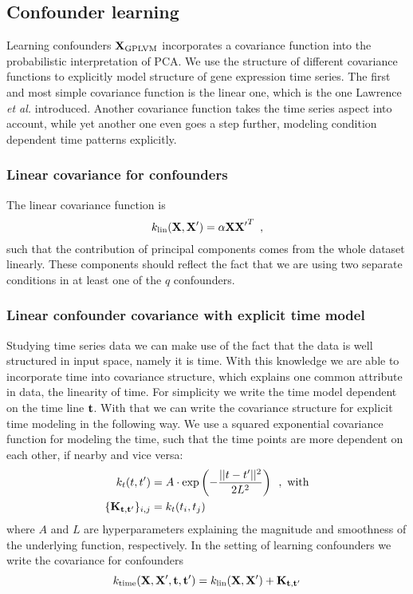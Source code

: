 \documentclass[11pt,a4paper,titlepage,twoside,tablecaptionabove]{article}
\begin{document}
\subsection{Confounder learning}
\label{sec:confounder-learning}

Learning confounders ${\bf X}_\text{GPLVM}$ incorporates a covariance
function into the probabilistic interpretation of PCA. We use
the structure of different covariance functions to explicitly model
structure of gene expression time series. The first and most simple
covariance function is the linear one, which is the one Lawrence {\it
  et al.} \cite{lawrence2004gaussian} introduced. Another covariance
function takes the time series aspect into account, while yet
another one even goes a step further, modeling condition dependent
time patterns explicitly.

\subsubsection{Linear covariance for confounders}
\label{sec:line-covar-conf}

The linear covariance function is
\begin{equation}
  \label{eq:5}
  k_\text{lin}({\bf X},{\bf X'}) = \alpha {\bf X}{\bf X'}^T\enspace,
\end{equation}
such that the contribution of principal components comes from the
whole dataset linearly. These components should reflect the fact that
we are using two separate conditions in at least one of the $q$
confounders. 

\subsubsection{Linear confounder covariance with explicit time model}
\label{sec:line-conf-covar}

Studying time series data we can make use of the fact that the data is
well structured in input space, namely it is time. With this knowledge
we are able to incorporate time into covariance structure, which
explains one common attribute in data, the linearity of time. For
simplicity we write the time model dependent on the time line $\bf
t$. With that we can write the covariance structure for explicit time
modeling in the following way. We use a squared exponential covariance
function for modeling the time, such that the time points are more dependent
on each other, if nearby and vice versa:
\begin{align}
  \label{eq:6}
  k_t(t,t') & =
  A\cdot\exp\left(-\frac{||t-t'||^2}{2L^2}\right)\enspace,\text{
    with}\\
  \{{\bf K}_{\bf t,t'}\}_{i,j} & = k_t(t_i,t_j)
\end{align}
where $A$ and $L$ are hyperparameters explaining the magnitude and
smoothness of the underlying function, respectively. In the setting of
learning confounders we write the covariance for confounders
\begin{equation}
  \label{eq:7}
  k_\text{time}({\bf X},{\bf X'},{\bf t,t'}) = k_\text{lin}({\bf
    X,X'}) + {\bf K_{\bf t,t'}}
\end{equation}
\end{document}
